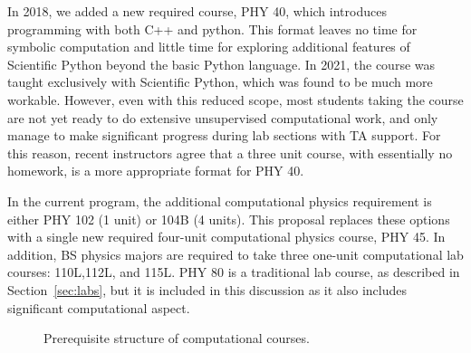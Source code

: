 \documentclass[12pt]{article}
\begin{document}
In 2018, we added a new required course, PHY 40, which introduces
programming with both C++ and python.  This format leaves no time for
symbolic computation and little time for exploring additional features
of Scientific Python beyond the basic Python language.  In 2021, the
course was taught exclusively with Scientific Python, which was found
to be much more workable.  However, even with this reduced scope, most
students taking the course are not yet ready to do extensive
unsupervised computational work, and only manage to make significant
progress during lab sections with TA support.  For this reason, recent
instructors agree that a three unit course, with essentially no
homework, is a more appropriate format for PHY 40.

In the current program, the additional computational physics
requirement is either PHY 102 (1 unit) or 104B (4 units).  This
proposal replaces these options with a single new required four-unit
computational physics course, PHY 45.  In addition, BS physics majors
are required to take three one-unit computational lab courses:
110L,112L, and 115L.  PHY 80 is a traditional lab course, as described in
Section~\ref{sec:labs}, but it is included in this discussion as it
also includes significant computational aspect.

\begin{figure}
\begin{center}
\caption{\label{fig:comps} Prerequisite structure of computational courses.}
\end{center}
\end{figure}
\end{document}
